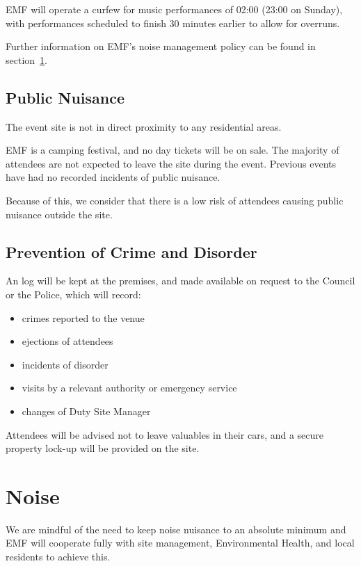 EMF will operate a curfew for music performances of 02:00 (23:00 on Sunday),
with performances scheduled to finish 30 minutes earlier to allow for overruns.

Further information on EMF's noise management policy can be found in
section~\ref{noise}.

\subsection{Public Nuisance}

The event site is not in direct proximity to any residential areas.

EMF is a camping festival, and no day tickets will be on sale. The majority of
attendees are not expected to leave the site during the event. Previous events
have had no recorded incidents of public nuisance.

Because of this, we consider that there is a low risk of attendees causing
public nuisance outside the site.

\subsection{Prevention of Crime and Disorder}

An log will be kept at the premises, and made available on request to the Council
or the Police, which will record:

\begin{itemize}
    \item crimes reported to the venue
    \item ejections of attendees
    \item incidents of disorder
    \item visits by a relevant authority or emergency service
    \item changes of Duty Site Manager
\end{itemize}

Attendees will be advised not to leave valuables in their cars, and a secure property
lock-up will be provided on the site.

\section{Noise}
\label{noise}
We are mindful of the need to keep noise nuisance to an absolute minimum and
EMF will cooperate fully with site management, Environmental Health, and local
residents to achieve this.

